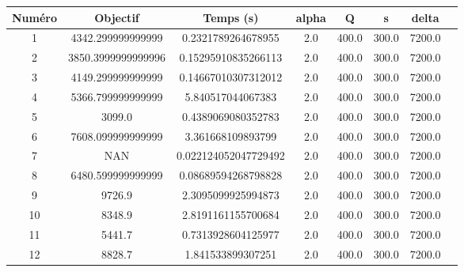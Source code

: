 \begin{tabular}{|c|c|c|c|c|c|c|c|}
\hline
 Numéro & Objectif & Temps (s) & alpha & Q & s & delta \\
\hline
1 & 4342.299999999999 & 0.2321789264678955 & 2.0 & 400.0 & 300.0 & 7200.0 \\ 
 \hline
2 & 3850.3999999999996 & 0.15295910835266113 & 2.0 & 400.0 & 300.0 & 7200.0 \\ 
 \hline
3 & 4149.299999999999 & 0.14667010307312012 & 2.0 & 400.0 & 300.0 & 7200.0 \\ 
 \hline
4 & 5366.799999999999 & 5.840517044067383 & 2.0 & 400.0 & 300.0 & 7200.0 \\ 
 \hline
5 & 3099.0 & 0.4389069080352783 & 2.0 & 400.0 & 300.0 & 7200.0 \\ 
 \hline
6 & 7608.099999999999 & 3.361668109893799 & 2.0 & 400.0 & 300.0 & 7200.0 \\ 
 \hline
7 & NAN & 0.022124052047729492 & 2.0 & 400.0 & 300.0 & 7200.0 \\ 
 \hline
8 & 6480.599999999999 & 0.08689594268798828 & 2.0 & 400.0 & 300.0 & 7200.0 \\ 
 \hline
9 & 9726.9 & 2.3095099925994873 & 2.0 & 400.0 & 300.0 & 7200.0 \\ 
 \hline
10 & 8348.9 & 2.8191161155700684 & 2.0 & 400.0 & 300.0 & 7200.0 \\ 
 \hline
11 & 5441.7 & 0.7313928604125977 & 2.0 & 400.0 & 300.0 & 7200.0 \\ 
 \hline
12 & 8828.7 & 1.841533899307251 & 2.0 & 400.0 & 300.0 & 7200.0 \\ 
 \hline
\end{tabular}
